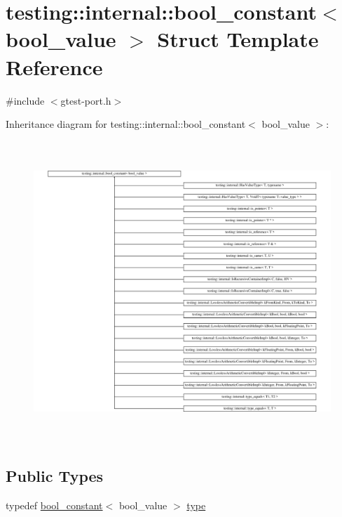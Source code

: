 \hypertarget{structtesting_1_1internal_1_1bool__constant}{}\section{testing\+::internal\+::bool\+\_\+constant$<$ bool\+\_\+value $>$ Struct Template Reference}
\label{structtesting_1_1internal_1_1bool__constant}


{\ttfamily \#include $<$gtest-\/port.\+h$>$}

Inheritance diagram for testing\+::internal\+::bool\+\_\+constant$<$ bool\+\_\+value $>$\+:\begin{figure}[H]
\begin{center}
\leavevmode
\includegraphics[height=11.329480cm]{structtesting_1_1internal_1_1bool__constant}
\end{center}
\end{figure}
\subsection*{Public Types}
\begin{DoxyCompactItemize}
\item 
typedef \mbox{\hyperlink{structtesting_1_1internal_1_1bool__constant}{bool\+\_\+constant}}$<$ bool\+\_\+value $>$ \mbox{\hyperlink{structtesting_1_1internal_1_1bool__constant_aba6d09ecf7eecea6c93480f0d627a167}{type}}
\end{DoxyCompactItemize}
